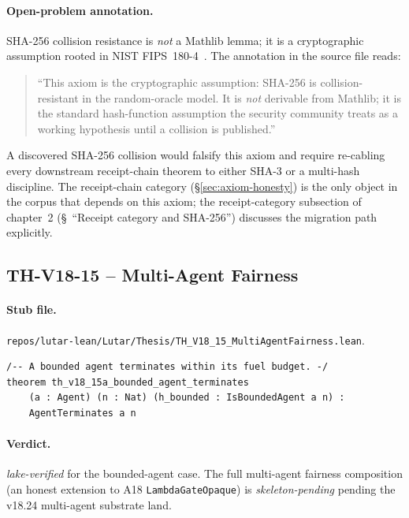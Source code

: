 \paragraph{Open-problem annotation.} SHA-256 collision resistance is
\emph{not} a Mathlib lemma; it is a cryptographic assumption rooted
in NIST FIPS~180-4~\cite{NIST-FIPS-180-4}. The annotation in the
source file reads:
\begin{quote}\small
``This axiom is the cryptographic assumption: SHA-256 is
collision-resistant in the random-oracle model. It is \emph{not}
derivable from Mathlib; it is the standard hash-function assumption
the security community treats as a working hypothesis until a
collision is published.''
\end{quote}
A discovered SHA-256 collision would falsify this axiom and require
re-cabling every downstream receipt-chain theorem to either SHA-3
or a multi-hash discipline. The receipt-chain category
(\S\ref{sec:axiom-honesty}) is the only object in the corpus that
depends on this axiom; the receipt-category subsection of chapter~2
(\S~``Receipt category and SHA-256'') discusses the migration path
explicitly.

\subsection{TH-V18-15 -- Multi-Agent Fairness}
\label{sub:thv18-15}

\paragraph{Stub file.}
\texttt{repos/lutar-lean/Lutar/Thesis/TH\_V18\_15\_MultiAgentFairness.lean}.

\begin{theorem}
\label{thm:thv18-15}
\begin{verbatim}
/-- A bounded agent terminates within its fuel budget. -/
theorem th_v18_15a_bounded_agent_terminates
    (a : Agent) (n : Nat) (h_bounded : IsBoundedAgent a n) :
    AgentTerminates a n
\end{verbatim}
\end{theorem}

\paragraph{Verdict.} \emph{lake-verified} for the bounded-agent
case. The full multi-agent fairness composition (an honest
extension to A18 \texttt{LambdaGateOpaque}) is
\emph{skeleton-pending} pending the v18.24 multi-agent
substrate land.

